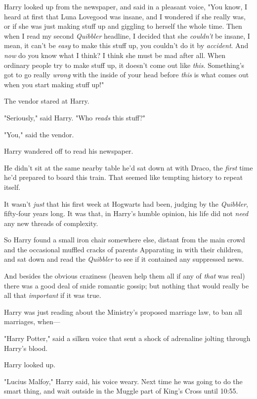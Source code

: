 Harry looked up from the newspaper, and said in a pleasant voice, "You know, I
heard at first that Luna Lovegood was insane, and I wondered if she really was,
or if she was just making stuff up and giggling to herself the whole time. Then
when I read my second \emph{Quibbler} headline, I decided that she
\emph{couldn't} be insane, I mean, it can't be \emph{easy} to make this stuff
up, you couldn't do it by \emph{accident}. And \emph{now} do you know what I
think? I think she must be mad after all. When ordinary people try to make
stuff up, it doesn't come out like \emph{this}. Something's got to go really
\emph{wrong} with the inside of your head before \emph{this} is what comes out
when you start making stuff up!"

The vendor stared at Harry.

"Seriously," said Harry. "Who \emph{reads} this stuff?"

"You," said the vendor.

Harry wandered off to read his newspaper.

He didn't sit at the same nearby table he'd sat down at with Draco, the
\emph{first} time he'd prepared to board this train. That seemed like tempting
history to repeat itself.

It wasn't \emph{just} that his first week at Hogwarts had been, judging by the
\emph{Quibbler}, fifty-four years long. It was that, in Harry's humble opinion,
his life did not \emph{need} any new threads of complexity.

So Harry found a small iron chair somewhere else, distant from the main crowd
and the occasional muffled cracks of parents Apparating in with their children,
and sat down and read the \emph{Quibbler} to see if it contained any suppressed
news.

And besides the obvious craziness (heaven help them all if any of \emph{that}
was real) there was a good deal of snide romantic gossip; but nothing that
would really be all that \emph{important} if it was true.

Harry was just reading about the Ministry's proposed marriage law, to ban all
marriages, when---

"Harry Potter," said a silken voice that sent a shock of adrenaline jolting
through Harry's blood.

Harry looked up.

"Lucius Malfoy," Harry said, his voice weary. Next time he was going to do the
smart thing, and wait outside in the Muggle part of King's Cross until 10:55\AM.

